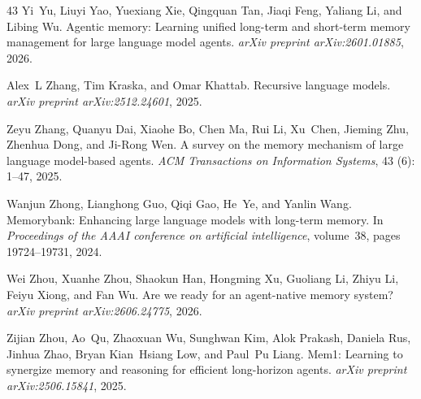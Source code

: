 \begin{thebibliography}{43}
Yi~Yu, Liuyi Yao, Yuexiang Xie, Qingquan Tan, Jiaqi Feng, Yaliang Li, and Libing Wu.
\newblock Agentic memory: Learning unified long-term and short-term memory management for large language model agents.
\newblock \emph{arXiv preprint arXiv:2601.01885}, 2026.

Alex~L Zhang, Tim Kraska, and Omar Khattab.
\newblock Recursive language models.
\newblock \emph{arXiv preprint arXiv:2512.24601}, 2025{}.

Zeyu Zhang, Quanyu Dai, Xiaohe Bo, Chen Ma, Rui Li, Xu~Chen, Jieming Zhu, Zhenhua Dong, and Ji-Rong Wen.
\newblock A survey on the memory mechanism of large language model-based agents.
\newblock \emph{ACM Transactions on Information Systems}, 43 (6): 1--47, 2025{}.

Wanjun Zhong, Lianghong Guo, Qiqi Gao, He~Ye, and Yanlin Wang.
\newblock Memorybank: Enhancing large language models with long-term memory.
\newblock In \emph{Proceedings of the AAAI conference on artificial intelligence}, volume~38, pages 19724--19731, 2024.

Wei Zhou, Xuanhe Zhou, Shaokun Han, Hongming Xu, Guoliang Li, Zhiyu Li, Feiyu Xiong, and Fan Wu.
\newblock Are we ready for an agent-native memory system?
\newblock \emph{arXiv preprint arXiv:2606.24775}, 2026.

Zijian Zhou, Ao~Qu, Zhaoxuan Wu, Sunghwan Kim, Alok Prakash, Daniela Rus, Jinhua Zhao, Bryan Kian~Hsiang Low, and Paul~Pu Liang.
\newblock Mem1: Learning to synergize memory and reasoning for efficient long-horizon agents.
\newblock \emph{arXiv preprint arXiv:2506.15841}, 2025.

\end{thebibliography}
